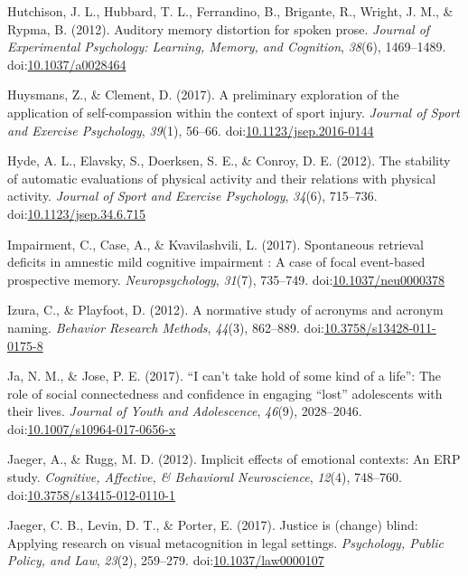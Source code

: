 \documentclass[english,man]{apa6}
\theoremstyle{definition}
\theoremstyle{definition}
\theoremstyle{definition}
\theoremstyle{remark}
\begin{document}
\hypertarget{ref-Hutchison2012}{}
Hutchison, J. L., Hubbard, T. L., Ferrandino, B., Brigante, R., Wright,
J. M., \& Rypma, B. (2012). Auditory memory distortion for spoken prose.
\emph{Journal of Experimental Psychology: Learning, Memory, and
Cognition}, \emph{38}(6), 1469--1489.
doi:\href{https://doi.org/10.1037/a0028464}{10.1037/a0028464}

\hypertarget{ref-Huysmans2017}{}
Huysmans, Z., \& Clement, D. (2017). A preliminary exploration of the
application of self-compassion within the context of sport injury.
\emph{Journal of Sport and Exercise Psychology}, \emph{39}(1), 56--66.
doi:\href{https://doi.org/10.1123/jsep.2016-0144}{10.1123/jsep.2016-0144}

\hypertarget{ref-Hyde2012}{}
Hyde, A. L., Elavsky, S., Doerksen, S. E., \& Conroy, D. E. (2012). The
stability of automatic evaluations of physical activity and their
relations with physical activity. \emph{Journal of Sport and Exercise
Psychology}, \emph{34}(6), 715--736.
doi:\href{https://doi.org/10.1123/jsep.34.6.715}{10.1123/jsep.34.6.715}

\hypertarget{ref-Impairment2017}{}
Impairment, C., Case, A., \& Kvavilashvili, L. (2017). Spontaneous
retrieval deficits in amnestic mild cognitive impairment : A case of
focal event-based prospective memory. \emph{Neuropsychology},
\emph{31}(7), 735--749.
doi:\href{https://doi.org/10.1037/neu0000378}{10.1037/neu0000378}

\hypertarget{ref-Izura2012}{}
Izura, C., \& Playfoot, D. (2012). A normative study of acronyms and
acronym naming. \emph{Behavior Research Methods}, \emph{44}(3),
862--889.
doi:\href{https://doi.org/10.3758/s13428-011-0175-8}{10.3758/s13428-011-0175-8}

\hypertarget{ref-Ja2017}{}
Ja, N. M., \& Jose, P. E. (2017). ``I can't take hold of some kind of a
life'': The role of social connectedness and confidence in engaging
``lost'' adolescents with their lives. \emph{Journal of Youth and
Adolescence}, \emph{46}(9), 2028--2046.
doi:\href{https://doi.org/10.1007/s10964-017-0656-x}{10.1007/s10964-017-0656-x}

\hypertarget{ref-Jaeger2012}{}
Jaeger, A., \& Rugg, M. D. (2012). Implicit effects of emotional
contexts: An ERP study. \emph{Cognitive, Affective, \& Behavioral
Neuroscience}, \emph{12}(4), 748--760.
doi:\href{https://doi.org/10.3758/s13415-012-0110-1}{10.3758/s13415-012-0110-1}

\hypertarget{ref-Jaeger2017}{}
Jaeger, C. B., Levin, D. T., \& Porter, E. (2017). Justice is (change)
blind: Applying research on visual metacognition in legal settings.
\emph{Psychology, Public Policy, and Law}, \emph{23}(2), 259--279.
doi:\href{https://doi.org/10.1037/law0000107}{10.1037/law0000107}
\end{document}

